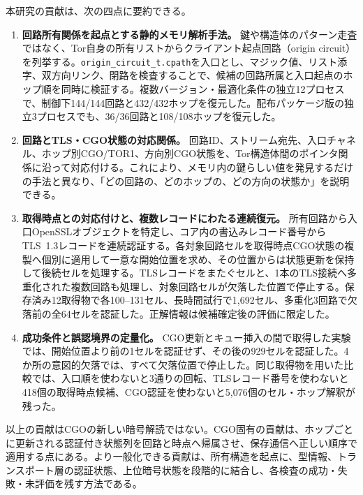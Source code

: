 \documentclass[10pt,a4paper]{ltjsarticle}
\newcommand{\code}[1]{\nolinkurl{#1}}
\newcommand{\torone}{\textsc{TOR1}}
\begin{document}
本研究の貢献は、次の四点に要約できる。

\begin{enumerate}[label=\textbf{C\arabic*.},leftmargin=3em]
  \item \textbf{回路所有関係を起点とする静的メモリ解析手法。}
  鍵や構造体のパターン走査ではなく、Tor自身の所有リストからクライアント起点回路（origin circuit）を列挙する。\code{origin_circuit_t.cpath}を入口とし、マジック値、リスト添字、双方向リンク、閉路を検査することで、候補の回路所属と入口起点のホップ順を同時に検証する。複数バージョン・最適化条件の独立12プロセスで、制御下144/144回路と432/432ホップを復元した。配布パッケージ版の独立3プロセスでも、36/36回路と108/108ホップを復元した。

  \item \textbf{回路とTLS・CGO状態の対応関係。}
  回路ID、ストリーム宛先、入口チャネル、ホップ別CGO/\torone{}、方向別CGO状態を、Tor構造体間のポインタ関係に沿って対応付ける。これにより、メモリ内の鍵らしい値を発見するだけの手法と異なり、「どの回路の、どのホップの、どの方向の状態か」を説明できる。

  \item \textbf{取得時点との対応付けと、複数レコードにわたる連続復元。}
  所有回路から入口OpenSSLオブジェクトを特定し、コア内の書込みレコード番号からTLS~1.3レコードを連続認証する。各対象回路セルを取得時点CGO状態の複製へ個別に適用して一意な開始位置を求め、その位置からは状態更新を保持して後続セルを処理する。TLSレコードをまたぐセルと、1本のTLS接続へ多重化された複数回路も処理し、対象回路セルが欠落した位置で停止する。保存済み12取得物で各100--131セル、長時間試行で1,692セル、多重化3回路で欠落前の全64セルを認証した。正解情報は候補確定後の評価に限定した。

  \item \textbf{成功条件と誤認境界の定量化。}
  CGO更新とキュー挿入の間で取得した実験では、開始位置より前の1セルを認証せず、その後の929セルを認証した。4か所の意図的欠落では、すべて欠落位置で停止した。同じ取得物を用いた比較では、入口順を使わないと3通りの回転、TLSレコード番号を使わないと418個の取得時点候補、CGO認証を使わないと5,076個のセル・ホップ解釈が残った。
\end{enumerate}

以上の貢献はCGOの新しい暗号解読ではない。CGO固有の貢献は、ホップごとに更新される認証付き状態列を回路と時点へ帰属させ、保存通信へ正しい順序で適用する点にある。より一般化できる貢献は、所有構造を起点に、型情報、トランスポート層の認証状態、上位暗号状態を段階的に結合し、各検査の成功・失敗・未評価を残す方法である。
\end{document}
